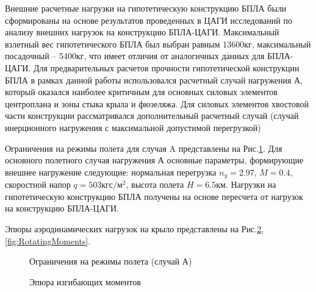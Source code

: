 Внешние расчетные нагрузки на гипотетическую конструкцию БПЛА были сформированы на основе результатов проведенных в ЦАГИ исследований \cite{BPS_TSAGI} по анализу внешних нагрузок на конструкцию БПЛА-ЦАГИ. Максимальный взлетный вес гипотетического БПЛА был выбран равным 13600кг, максимальный посадочный -- 5400кг, что имеет отличия от аналогичных данных для БПЛА-ЦАГИ. Для предварительных расчетов прочности гипотетической конструкции БПЛА в рамках данной работы использовался расчетный случай нагружения А, который оказался наиболее критичным для основных силовых элементов центроплана и зоны стыка крыла и фюзеляжа. Для силовых элементов хвостовой части конструкции рассматривался дополнительный расчетный случай (случай инерционного нагружения с максимальной допустимой перегрузкой) 



Ограничения на режимы полета для случая A представлены на Рис.\ref{fig:ModeOfFlight}. Для основного полетного случая нагружения А основные параметры, формирующие внешнее нагружение следующие: нормальная перегрузка $n_y = 2.97$, $M = 0.4$, скоростной напор $q = 503 \text{кгс}/\text{м}^2$, высота полета $H = 6.5\text{км}$. Нагрузки на гипотетическую конструкцию БПЛА получены на основе пересчета от нагрузок на конструкцию БПЛА-ЦАГИ.


Эпюры аэродинамических нагрузок на крыло представлены на Рис.\ref{fig:BendingMoments},\ref{fig:RotatingMoments}.





\begin{figure}[H]
\centering
\def\svgwidth{0.9\textwidth}

\caption{Ограничения на режимы полета (случай А)}
\label{fig:ModeOfFlight}
\end{figure}


\begin{figure}[H]
\centering
\def\svgwidth{0.9\textwidth}

\caption{Эпюра изгибающих моментов}
\label{fig:BendingMoments}
\end{figure}


